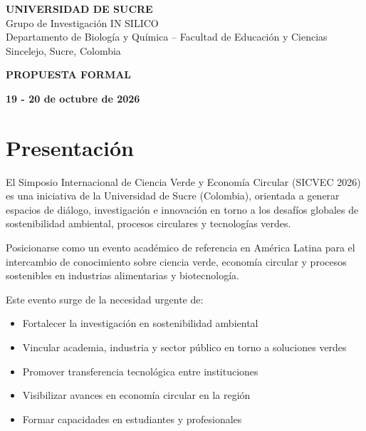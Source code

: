\documentclass[12pt,a4paper]{article}
\begin{document}
\begin{center}
\vspace{0.2cm}

{\Large\bfseries\color{verdeosc} UNIVERSIDAD DE SUCRE}\\[0.2cm]
{\small Grupo de Investigación IN SILICO}\\[0.2cm]
{\small Departamento de Biología y Química -- Facultad de Educación y Ciencias}\\[0.2cm]
{\small Sincelejo, Sucre, Colombia}

\vspace{1.2cm}

{\large\bfseries\color{verdeosc} PROPUESTA FORMAL}

\vspace{0.5cm}

{\normalsize\bfseries\color{verdemid} 19 - 20 de octubre de 2026}

\end{center}

\newpage

\tableofcontents
\newpage

\section{Presentación}

El Simposio Internacional de Ciencia Verde y Economía Circular (SICVEC 2026) es una iniciativa de la Universidad de Sucre (Colombia), orientada a generar espacios de diálogo, investigación e innovación en torno a los desafíos globales de sostenibilidad ambiental, procesos circulares y tecnologías verdes.

\begin{tcolorbox}[cajainfo, title=Visión Estratégica]
Posicionarse como un evento académico de referencia en América Latina para el intercambio de conocimiento sobre ciencia verde, economía circular y procesos sostenibles en industrias alimentarias y biotecnología.
\end{tcolorbox}

Este evento surge de la necesidad urgente de:

\begin{itemize}[label={\textcolor{verdeosc}{\textbullet}}]
  \item Fortalecer la investigación en sostenibilidad ambiental
  \item Vincular academia, industria y sector público en torno a soluciones verdes
  \item Promover transferencia tecnológica entre instituciones
  \item Visibilizar avances en economía circular en la región
  \item Formar capacidades en estudiantes y profesionales
\end{itemize}
\end{document}
